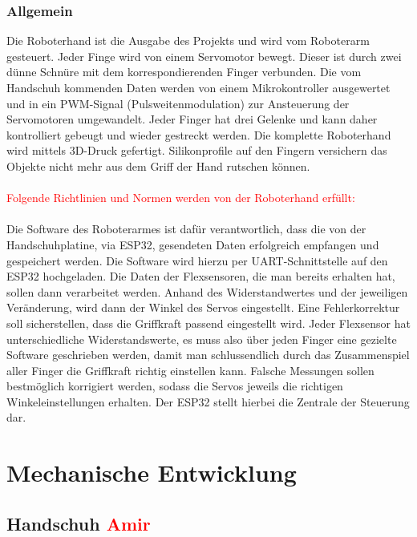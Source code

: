 \documentclass[11pt]{article}
\begin{document}
\subsubsection{Allgemein}
Die Roboterhand ist die Ausgabe des Projekts und wird vom Roboterarm gesteuert. Jeder Finge wird von einem Servomotor 
bewegt. Dieser ist durch zwei dünne Schnüre mit dem korrespondierenden Finger verbunden. Die vom Handschuh kommenden 
Daten werden von einem Mikrokontroller ausgewertet und in ein PWM-Signal (Pulsweitenmodulation) zur Ansteuerung der 
Servomotoren umgewandelt. Jeder Finger hat drei Gelenke und kann daher kontrolliert gebeugt und wieder gestreckt werden. 
Die komplette Roboterhand wird mittels 3D-Druck gefertigt. Silikonprofile auf den Fingern versichern das Objekte nicht 
mehr aus dem Griff der Hand rutschen können.\\
\\
\textcolor{red}{Folgende Richtlinien und Normen werden von der Roboterhand erfüllt:}\\
\\
Die Software des Roboterarmes ist dafür verantwortlich, dass die von der Handschuhplatine, via ESP32, gesendeten Daten 
erfolgreich empfangen und gespeichert werden. Die Software wird hierzu per UART-Schnittstelle auf den ESP32 hochgeladen. 
Die Daten der Flexsensoren, die man bereits erhalten hat, sollen dann verarbeitet werden. Anhand des Widerstandwertes und 
der jeweiligen Veränderung, wird dann der Winkel des Servos eingestellt. Eine Fehlerkorrektur soll sicherstellen, dass die 
Griffkraft passend eingestellt wird. Jeder Flexsensor hat unterschiedliche Widerstandswerte, es muss also über jeden Finger 
eine gezielte Software geschrieben werden, damit man schlussendlich durch das Zusammenspiel aller Finger die Griffkraft 
richtig einstellen kann. Falsche Messungen sollen bestmöglich korrigiert werden, sodass die Servos jeweils die richtigen 
Winkeleinstellungen erhalten. Der ESP32 stellt hierbei die Zentrale der Steuerung dar.

\hfill \break
\hfill \break


\section{Mechanische Entwicklung}

\subsection{Handschuh \textcolor{red}{Amir}}
\end{document}
